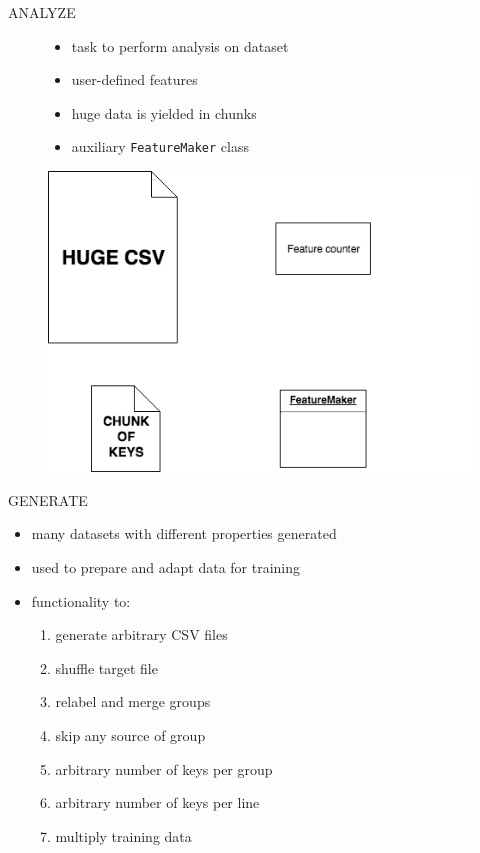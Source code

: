 \documentclass{beamer}
\begin{document}
\begin{darkframes}
    \begin{frame}{ANALYZE}
      \begin{figure}[H]
        \centering
        \begin{minipage}{.5\textwidth}
          \begin{itemize}
            \item task to perform analysis on dataset
            \item user-defined features
            \item huge data is yielded in chunks
            \item auxiliary \texttt{FeatureMaker} class
          \end{itemize}          
        \end{minipage}%
        \begin{minipage}{.5\textwidth}
          \centering
          \includegraphics[width=0.98\linewidth]{../tex/images/analyze_task_img}
        \end{minipage}
      \end{figure}  
    \end{frame}

    \begin{frame}{GENERATE}
      \begin{itemize}
        \item many datasets with different properties generated
        \item used to prepare and adapt data for training
        \item functionality to:
        \begin{enumerate}
          \item generate arbitrary CSV files
          \item shuffle target file
          \item relabel and merge groups
          \item skip any source of group
          \item arbitrary number of keys per group
          \item arbitrary number of keys per line
          \item multiply training data
        \end{enumerate}
      \end{itemize}
    \end{frame}


\end{darkframes}
\end{document}
